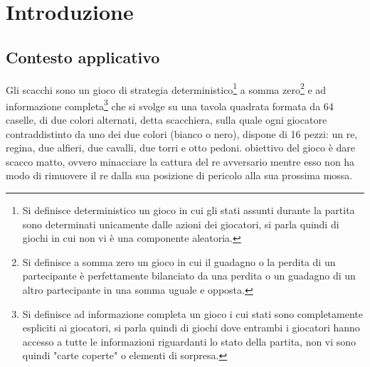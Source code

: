 \chapter{Introduzione}

\section{Contesto applicativo} %
Gli scacchi sono un gioco di strategia deterministico\footnote{Si definisce deterministico un gioco in cui gli stati assunti durante la partita sono determinati
unicamente dalle azioni dei giocatori, si parla quindi di giochi in cui non vi è una componente aleatoria.} a somma zero\footnote{Si definisce a somma zero un gioco in cui il guadagno o la perdita di un partecipante è perfettamente bilanciato da una perdita o un guadagno di un altro partecipante in una somma uguale e opposta.} e ad informazione completa\footnote{Si definisce ad informazione completa un gioco i cui stati sono
completamente espliciti ai giocatori, si parla quindi di giochi dove entrambi i giocatori hanno accesso a tutte le informazioni riguardanti lo stato della partita, non vi sono quindi "carte coperte" o elementi di sorpresa.}  
che si svolge su una tavola quadrata formata da 64 caselle, di due colori alternati,
detta scacchiera, sulla quale ogni giocatore contraddistinto da uno dei due colori (bianco o nero), dispone di 16 pezzi: un re, regina, due alfieri, due cavalli, due torri e otto pedoni.
obiettivo del gioco è dare scacco matto, ovvero minacciare la cattura del re avversario mentre esso non
ha modo di rimuovere il re dalla sua posizione di pericolo alla sua prossima mossa.



